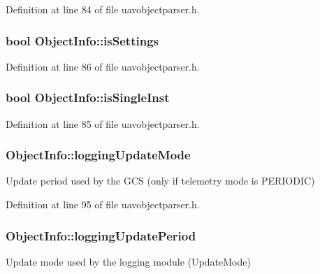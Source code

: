 Definition at line 84 of file uavobjectparser.\-h.

\hypertarget{struct_object_info_a8a4b9d3a602cd467a21b4dfe2b9a7fa0}{
\subsubsection[{is\-Settings}]{\setlength{\rightskip}{0pt plus 5cm}bool Object\-Info\-::is\-Settings}}\label{struct_object_info_a8a4b9d3a602cd467a21b4dfe2b9a7fa0}


Definition at line 86 of file uavobjectparser.\-h.

\hypertarget{struct_object_info_a6e98a9ae0a0093b9312732489be70349}{
\subsubsection[{is\-Single\-Inst}]{\setlength{\rightskip}{0pt plus 5cm}bool Object\-Info\-::is\-Single\-Inst}}\label{struct_object_info_a6e98a9ae0a0093b9312732489be70349}


Definition at line 85 of file uavobjectparser.\-h.

\hypertarget{struct_object_info_af7ceece058b71fa50c2419c1965f16ad}{
\subsubsection[{logging\-Update\-Mode}]{ Object\-Info\-::logging\-Update\-Mode}}\label{struct_object_info_af7ceece058b71fa50c2419c1965f16ad}
Update period used by the G\-C\-S (only if telemetry mode is P\-E\-R\-I\-O\-D\-I\-C) 

Definition at line 95 of file uavobjectparser.\-h.

\hypertarget{struct_object_info_ab3ab131200aca06627069c30e93553ca}{
\subsubsection[{logging\-Update\-Period}]{ Object\-Info\-::logging\-Update\-Period}}\label{struct_object_info_ab3ab131200aca06627069c30e93553ca}
Update mode used by the logging module (Update\-Mode) 

